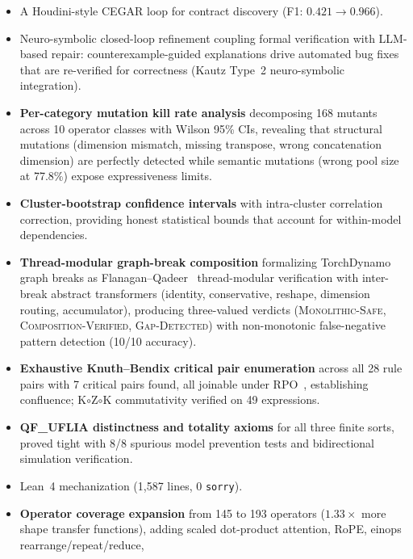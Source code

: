 \documentclass[11pt]{article}
\begin{document}
\begin{itemize}[leftmargin=2em]
    per-layer safety reasoning and counterexample traces, with
    CVC5 native Craig interpolation~\cite{tinelli03} guaranteeing
    all three Craig properties (implication, separation, vocabulary
    restriction) for predicate discovery.
  \item A Houdini-style CEGAR loop for contract discovery
    (F1: $0.421 \to 0.966$).
  \item Neuro-symbolic closed-loop refinement coupling formal
    verification with LLM-based repair: counterexample-guided
    explanations drive automated bug fixes that are re-verified
    for correctness (Kautz Type~2 neuro-symbolic integration).
  \item \textbf{Per-category mutation kill rate analysis} decomposing
    168 mutants across 10 operator classes with Wilson 95\% CIs,
    revealing that structural mutations (dimension mismatch, missing
    transpose, wrong concatenation dimension) are perfectly detected while semantic mutations
    (wrong pool size at 77.8\%) expose expressiveness limits.
  \item \textbf{Cluster-bootstrap confidence intervals} with
    intra-cluster correlation correction, providing honest
    statistical bounds that account for within-model dependencies.
  \item \textbf{Thread-modular graph-break composition} formalizing
    TorchDynamo graph breaks as Flanagan--Qadeer~\cite{flanagan03}
    thread-modular verification with inter-break abstract transformers
    (identity, conservative, reshape, dimension routing, accumulator),
    producing three-valued verdicts (\textsc{Monolithic-Safe},
    \textsc{Composition-Verified}, \textsc{Gap-Detected}) with
    non-monotonic false-negative pattern detection (10/10 accuracy).
  \item \textbf{Exhaustive Knuth--Bendix critical pair enumeration}
    across all 28 rule pairs with 7 critical pairs found, all joinable
    under RPO~\cite{dershowitz82}, establishing confluence; K$\circ$Z$\circ$K
    commutativity verified on 49 expressions.
  \item \textbf{QF\_UFLIA distinctness and totality axioms} for all
    three finite sorts, proved tight with 8/8 spurious model
    prevention tests and bidirectional simulation verification.
  \item Lean~4 mechanization (1,587 lines, 0 \texttt{sorry}).
  \item \textbf{Operator coverage expansion} from 145 to 193
    operators ($1.33\times$ more shape transfer functions),
    adding scaled dot-product attention, RoPE, einops rearrange/repeat/reduce,

\end{itemize}
\end{document}
